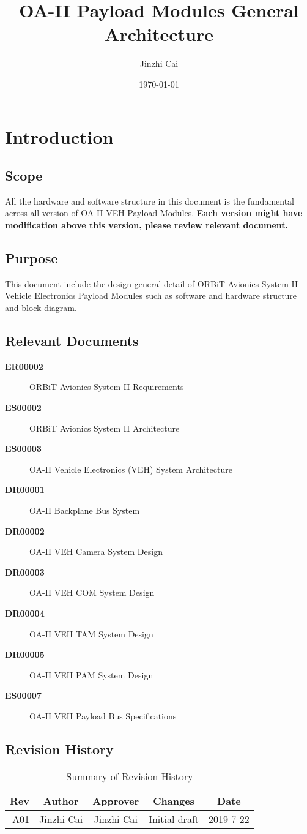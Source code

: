 \documentclass[12pt,article]{memoir}
\title{OA-II Payload Modules General Architecture}
\author{Jinzhi Cai}
\date{\today}
\begin{document}
	


\tableofcontents*
\clearpage


\chapter{Introduction}
\section{Scope}
All the hardware and software structure in this document is the fundamental across all version of OA-II VEH Payload Modules. \textbf{Each version might have modification above this version, please review relevant document.}
\section{Purpose}
This document include the design general detail of ORBiT Avionics System II Vehicle Electronics Payload Modules such as software and hardware structure and block diagram.
\section{Relevant Documents}
\begin{description}
	\item[\textbf{ER00002}]ORBiT Avionics System II Requirements
	\item[\textbf{ES00002}]ORBiT Avionics System II Architecture
	\item[\textbf{ES00003}]OA-II Vehicle Electronics (VEH) System Architecture
	\item[\textbf{DR00001}]OA-II Backplane Bus System
	\item[\textbf{DR00002}]OA-II VEH Camera System Design
	\item[\textbf{DR00003}]OA-II VEH COM System Design
	\item[\textbf{DR00004}]OA-II VEH TAM System Design
	\item[\textbf{DR00005}]OA-II VEH PAM System Design
	\item[\textbf{ES00007}]OA-II VEH Payload Bus Specifications
\end{description}
\section{Revision History}
\begin{table}[H]
	\centering
	\begin{tabu}{r || c | c | c | c }
		Rev & Author & Approver & Changes & Date\\ \hline
		A01 & Jinzhi Cai & Jinzhi Cai & Initial draft & 2019-7-22 \\
	\end{tabu}
	\caption{Summary of Revision History}
	\label{tab:rev}
\end{table}
\newpage
\end{document}
